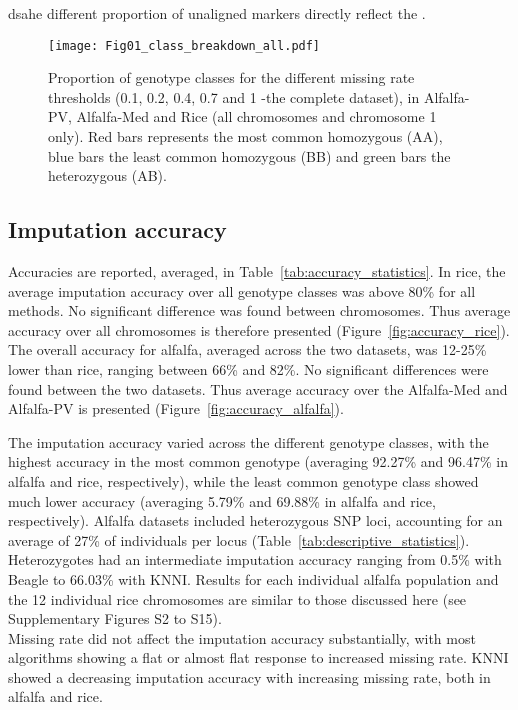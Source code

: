 dsahe different proportion of unaligned markers directly reflect the .

\begin{figure}
\texttt{[image: Fig01\_class\_breakdown\_all.pdf]}
\caption[Proportions of genotype classes]{​Proportion of genotype classes for the different missing rate thresholds (0.1, 0.2, 0.4, 0.7 and 1 -the complete dataset), in Alfalfa-PV, Alfalfa-Med and Rice (all chromosomes and chromosome 1 only). Red bars represents the most common homozygous (AA), blue bars the least common homozygous (BB) and green bars the heterozygous (AB).}
\label{fig:genotype_classes}
\end{figure}

\subsection{Imputation accuracy}
\label{sec:imputation_accuracy}  



Accuracies are reported, averaged, in Table~\ref{tab:accuracy_statistics}. In rice, the average imputation accuracy over all genotype classes was above 80\% for all methods. No significant difference was found between chromosomes. Thus average accuracy over all chromosomes is therefore presented (Figure~\ref{fig:accuracy_rice}). \\
The overall accuracy for alfalfa, averaged across the two datasets, was 12-25\% lower than rice, ranging between 66\% and 82\%. No significant differences were found between the two datasets. Thus average accuracy over the Alfalfa-Med and Alfalfa-PV is presented (Figure~\ref{fig:accuracy_alfalfa}).

The imputation accuracy varied across the different genotype classes, with the highest accuracy in the most common genotype (averaging 92.27\% and 96.47\% in alfalfa and rice, respectively), while the least common genotype class showed much lower accuracy (averaging 5.79\% and 69.88\% in alfalfa and rice, respectively).
Alfalfa datasets included heterozygous SNP loci, accounting for an average of 27\% of individuals per locus (Table~\ref{tab:descriptive_statistics}). Heterozygotes had an intermediate imputation accuracy ranging from 0.5\% with Beagle to 66.03\% with KNNI. Results for each individual alfalfa population and the 12 individual rice chromosomes are similar to those discussed here (see Supplementary Figures S2 to S15). \\
Missing rate did not affect the imputation accuracy substantially, with most algorithms showing a flat or almost flat response to increased missing rate. KNNI showed a decreasing imputation accuracy with increasing missing rate, both in alfalfa and rice.

